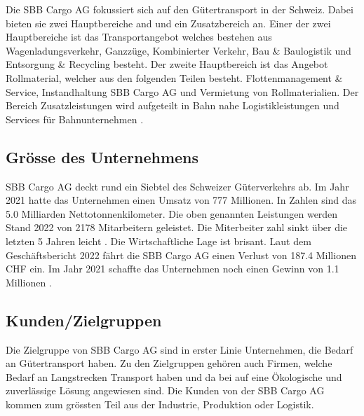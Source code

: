 \documentclass{article}
\begin{document}
Die SBB Cargo AG fokussiert sich auf den Gütertransport in der Schweiz.
Dabei bieten sie zwei Hauptbereiche and und ein Zusatzbereich an.
Einer der zwei Hauptbereiche ist das Transportangebot welches bestehen aus Wagenladungsverkehr, Ganzzüge, Kombinierter Verkehr, Bau \& Baulogistik und Entsorgung \& Recycling besteht.
Der zweite Hauptbereich ist das Angebot Rollmaterial, welcher aus den folgenden Teilen besteht. Flottenmanagement \& Service, Instandhaltung SBB Cargo AG und Vermietung von Rollmaterialien. 
Der Bereich Zusatzleistungen wird aufgeteilt in Bahn nahe Logistikleistungen und Services für Bahnunternehmen \parencite[o. S.]{angebot}.

\subsection{Grösse des Unternehmens }

SBB Cargo AG deckt rund ein Siebtel des Schweizer Güterverkehrs ab.
Im Jahr 2021 hatte das Unternehmen einen Umsatz von 777 Millionen.
In Zahlen sind das 5.0 Milliarden Nettotonnenkilometer.
Die oben genannten Leistungen werden Stand 2022 von 2178 Mitarbeitern geleistet.
Die Miterbeiter zahl sinkt über die letzten 5 Jahren leicht \parencite[o. S.]{personal}.
Die Wirtschaftliche Lage ist brisant.
Laut dem Geschäftsbericht 2022 fährt die SBB Cargo AG einen Verlust von 187.4 Millionen CHF ein.
Im Jahr 2021 schaffte das Unternehmen noch einen Gewinn von 1.1 Millionen \parencite[S. 46]{geschaeftsbericht2022}.

\subsection{Kunden/Zielgruppen}

Die Zielgruppe von SBB Cargo AG sind in erster Linie Unternehmen, die Bedarf an Gütertransport haben.
Zu den Zielgruppen gehören auch Firmen, welche Bedarf an Langstrecken Transport haben und da bei auf eine Ökologische und zuverlässige Lösung angewiesen sind.
Die Kunden von der SBB Cargo AG kommen zum grössten Teil aus der Industrie, Produktion oder Logistik.
\end{document}

